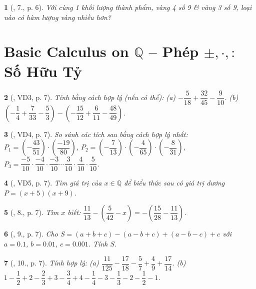 \documentclass{article}
\newtheorem{baitoan}{}
\begin{document}
\begin{baitoan}[\cite{Tuyen_Toan_7}, 7., p. 6]
	Với cùng 1 khối lượng thành phẩm, vàng 4 số 9 \& vàng 3 số 9, loại nào có hàm lượng vàng nhiều hơn?
\end{baitoan}


\section{Basic Calculus on $\mathbb{Q}$ -- Phép $\pm,\cdot,:$ Số Hữu Tỷ}

\begin{baitoan}[\cite{Tuyen_Toan_7}, VD3, p. 7]
	Tính bằng cách hợp lý (nếu có thể): (a) $-\dfrac{5}{18} + \dfrac{32}{45} - \dfrac{9}{10}$. (b) $\left(-\dfrac{1}{4} + \dfrac{7}{33} - \dfrac{5}{3}\right) - \left(-\dfrac{15}{12} + \dfrac{6}{11} - \dfrac{48}{49}\right)$.
\end{baitoan}

\begin{baitoan}[\cite{Tuyen_Toan_7}, VD4, p. 7]
	So sánh các tích sau bằng cách hợp lý nhất: $P_1 = \left(-\dfrac{43}{51}\right)\cdot\left(\dfrac{-19}{80}\right)$, $P_2 = \left(-\dfrac{7}{13}\right)\cdot\left(-\dfrac{4}{65}\right)\cdot\left(-\dfrac{8}{31}\right)$, $P_3 = \dfrac{-5}{10}\cdot\dfrac{-4}{10}\cdot\dfrac{-3}{10}\cdots\dfrac{3}{10}\cdot\dfrac{4}{10}\cdot\dfrac{5}{10}$.
\end{baitoan}

\begin{baitoan}[\cite{Tuyen_Toan_7}, VD5, p. 7]
	Tìm giá trị của $x\in\mathbb{Q}$ để biểu thức sau có giá trị dương  $P = (x + 5)(x + 9)$.
\end{baitoan}

\begin{baitoan}[\cite{Tuyen_Toan_7}, 8., p. 7]
	Tìm $x$ biết: $\dfrac{11}{13} - \left(\dfrac{5}{42} - x\right) = -\left(\dfrac{15}{28} - \dfrac{11}{13}\right)$.
\end{baitoan}

\begin{baitoan}[\cite{Tuyen_Toan_7}, 9., p. 7]
	Cho $S = (a + b + c) - (a - b + c) + (a - b - c) + c$ với $a = 0.1$, $b = 0.01$, $c = 0.001$. Tính $S$.
\end{baitoan}

\begin{baitoan}[\cite{Tuyen_Toan_7}, 10., p. 7]
	Tính hợp lý: (a) $\dfrac{11}{125} - \dfrac{17}{18} - \dfrac{5}{7} + \dfrac{4}{9} + \dfrac{17}{14}$. (b) $1 - \dfrac{1}{2} + 2 - \dfrac{2}{3} + 3 - \dfrac{3}{4} + 4 - \dfrac{1}{4} - 3 - \dfrac{1}{3} - 2 - \dfrac{1}{2} - 1$.
\end{baitoan}
\end{document}
